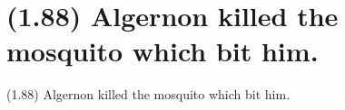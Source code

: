 \documentclass{article}
\begin{document}
\clearpage

%
%

\section*{(1.88) Algernon killed the mosquito which bit him.}

\bigbreak
\begin{enumerate*}
\item[(1.88)] Algernon killed the mosquito which bit him.
\end{enumerate*}
\bigbreak
\end{document}
